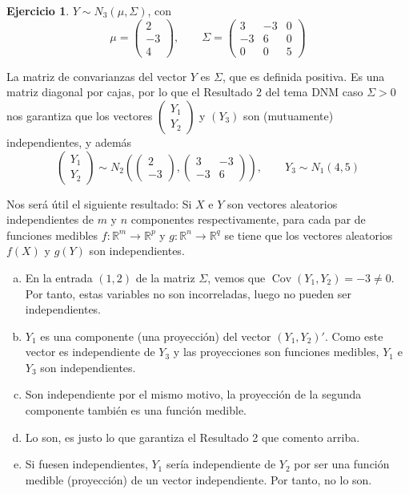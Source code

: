 \documentclass[12pt,spanish]{article}
\theoremstyle{definition}
\newtheorem{exercise}{Ejercicio}
\begin{document}
\begin{exercise} %
  $Y\sim N_3(\mu,\Sigma)$, con
  \[\mu=
    \begin{pmatrix}
      2 \\
      -3 \\
      4
    \end{pmatrix},\qquad \Sigma=
    \begin{pmatrix}
      3 & -3 & 0 \\
      -3 & 6 & 0 \\
      0 & 0 & 5
    \end{pmatrix}
  \]

  La matriz de convarianzas del vector $Y$ es $\Sigma$, que es
  definida positiva. Es una matriz diagonal por cajas, por lo que el
  Resultado 2 del tema DNM caso $\Sigma>0$ nos garantiza que los
  vectores $
  \begin{pmatrix}
    Y_1 \\
    Y_2
  \end{pmatrix}$ y $(Y_3)$ son (mutuamente) independientes, y además
  \[\begin{pmatrix}
      Y_1 \\
      Y_2
    \end{pmatrix}\sim N_2\left(\begin{pmatrix}
        2 \\
        -3
      \end{pmatrix},\begin{pmatrix}
        3 & -3 \\
        -3 & 6
      \end{pmatrix}\right),\qquad Y_3\sim N_1(4,5)\]

  Nos será útil el siguiente resultado: Si $X$ e $Y$ son vectores
  aleatorios independientes de $m$ y $n$ componentes respectivamente,
  para cada par de funciones medibles
  $f:\mathbb{R }^m\rightarrow\mathbb{R}^p$ y
  $g:\mathbb{R }^n\rightarrow\mathbb{R}^q$ se tiene que los vectores
  aleatorios $f(X)$ y $g(Y)$ son independientes.
  
  \begin{enumerate}[a)]
  \item En la entrada $(1,2)$ de la matriz $\Sigma$, vemos que
    $\operatorname{Cov}(Y_1,Y_2)=-3\neq 0$. Por tanto, estas variables
    no son incorreladas, luego no pueden ser independientes.
  \item $Y_1$ es una componente (una proyección) del vector
    $(Y_1,Y_2)'$. Como este vector es independiente de $Y_3$ y las
    proyecciones son funciones medibles, $Y_1$ e $Y_3$ son
    independientes.
  \item Son independiente por el mismo motivo, la proyección de la
    segunda componente también es una función medible.
  \item Lo son, es justo lo que garantiza el Resultado 2 que comento
    arriba.
  \item Si fuesen independientes, $Y_1$ sería independiente de $Y_2$
    por ser una función medible (proyección) de un vector
    independiente. Por tanto, no lo son.
  \end{enumerate}
\end{exercise}
\end{document}

